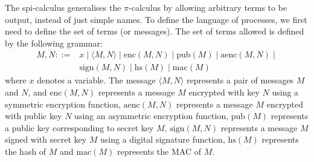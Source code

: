 \documentclass{article}
\begin{document}
The spi-calculus generalises the $\pi$-calculus by allowing arbitrary terms to be output,
instead of just simple names. To define the language of processes, we first need to define
the set of terms (or messages). The set of terms allowed is defined by the following grammar:
$$
\begin{array}{ll}
M, N  ::= & x \mid \langle M, N \rangle \mid \mathrm{enc}(M, N) \mid \mathrm{pub}(M) \mid \mathrm{aenc}(M, N) \mid \\
	  & \mathrm {sign}(M, N) \mid \mathrm{hs}(M) \mid \mathrm{mac}(M)
\end{array}
$$
where $x$ denotes a variable.
The message $\langle M, N \rangle$ represents
a pair of messages $M$ and $N$, and $\mathrm{enc}(M,N)$ represents a message $M$ encrypted
with key $N$ using a symmetric encryption function, $\mathrm{aenc}(M, N)$ represents a message $M$ encrypted with public key $N$
using an asymmetric encryption function, $\mathrm{pub}(M)$ represents a public key corresponding
to secret key $M$, $\mathrm{sign}(M, N)$ represents a message $M$ signed with secret key $M$ using
a digital signature function, $\mathrm{hs}(M)$ represents the hash of $M$ and $\mathrm{mac}(M)$ represents the
MAC of $M$.
\end{document}
